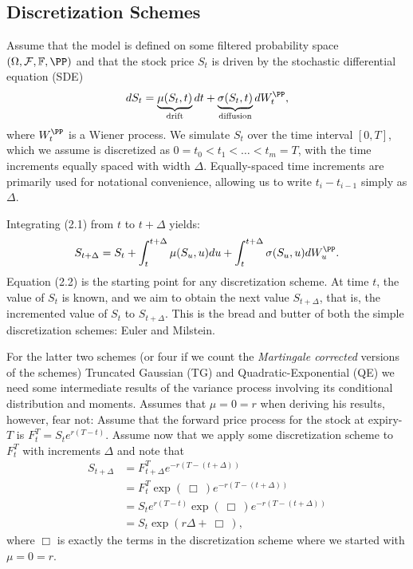 \documentclass[11pt]{article}
\numberwithin{equation}{section}
\begin{document}
\subsection{Discretization Schemes}
Assume that the model is defined on some filtered probability space
$(\Omega,\mathcal{F},\mathbb{F},\PP)$ and that the stock price $S_t$ is driven by the stochastic differential equation (SDE)
\begin{align}
dS_t = \underbrace{ \mu(S_t, t)}_{\text{drift}} dt + \underbrace{\sigma(S_t, t)}_{\text{diffusion}}dW_t^\PP,
\end{align}
where $W_t^\PP$ is a Wiener process. We simulate $S_t$ over the time interval $[0, T]$, which we assume is discretized as $0 = t_0 < t_1 < \dots < t_m = T$, with the time increments equally spaced with width $\Delta$. Equally-spaced time increments are primarily used for notational convenience, allowing us to write $t_{i} - t_{i-1}$ simply as $\Delta$.

Integrating (2.1) from $t$ to $t + \Delta$ yields:
\begin{align}
S_{t+\Delta} = S_t + \int_t^{t+\Delta} \mu(S_u, u)  du + \int_t^{t+\Delta} \sigma(S_u, u)  dW_u^\PP.
\end{align}
Equation (2.2) is the starting point for any discretization scheme. At time $t$,
the value of $S_t$ is known, and we aim to obtain the next value $S_{t+\Delta}$,
that is, the incremented value of $S_t$ to $S_{t+\Delta}$. This is the bread and
butter of both the simple discretization schemes: Euler and Milstein.

For the latter two schemes (or four if we count the \textit{Martingale corrected} versions of
the schemes) Truncated Gaussian (TG) and Quadratic-Exponential (QE) we need some
intermediate results of the variance process involving its conditional
distribution and moments. \cite{andersen2007efficient} Assumes that $\mu=0=r$ when
deriving his results, however, fear not: Assume that the forward price process
for the stock at expiry-$T$ is $F_t^T=S_te^{r(T-t)}$. Assume now that we apply
some discretization scheme to $F_t^T$ with increments $\Delta$ and note that
\begin{align*}
    S_{t+\Delta} &= F_{t+\Delta}^T e^{-r(T-(t+\Delta))}\\
    &=F_t^T \exp(\ \Box \ ) e^{-r(T-(t+\Delta))}\\
    &=S_t e^{r(T-t)}\exp(\ \Box \ ) e^{-r(T-(t+\Delta))}\\
    &=S_t \exp(r\Delta + \ \Box \ ),
\end{align*} 
where $\Box$ is exactly the terms in the discretization scheme where we started with $\mu=0=r$.
\end{document}
